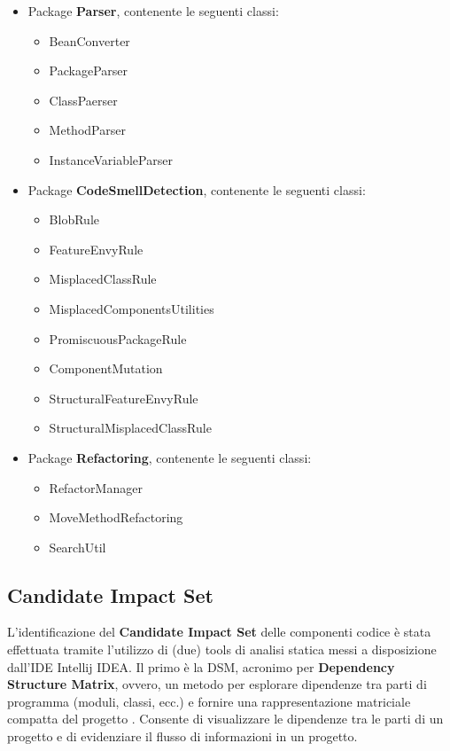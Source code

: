 	\begin{itemize}
		\item Package \textbf{Parser}, contenente le seguenti classi:
			\begin{itemize}
				\item BeanConverter
				\item PackageParser
				\item ClassPaerser
				\item MethodParser
				\item InstanceVariableParser
			\end{itemize}
		
		\item Package \textbf{CodeSmellDetection}, contenente le seguenti classi:
			\begin{itemize}
				
				\item BlobRule
				\item FeatureEnvyRule
				\item MisplacedClassRule
				\item MisplacedComponentsUtilities
				\item PromiscuousPackageRule
				\item ComponentMutation
				\item StructuralFeatureEnvyRule
				\item StructuralMisplacedClassRule
							
			\end{itemize}
		
		\item Package \textbf{Refactoring}, contenente le seguenti classi:
		
			\begin{itemize}
				
				\item RefactorManager
				\item MoveMethodRefactoring
				\item SearchUtil
						
			\end{itemize}	
			
		
		
	\end{itemize}


	\subsection{Candidate Impact Set}

	L'identificazione del \textbf{Candidate Impact Set} delle componenti codice è stata effettuata tramite l'utilizzo di (due) tools di analisi statica messi a disposizione dall'IDE Intellij IDEA. Il primo è la DSM, acronimo per \textbf{Dependency Structure Matrix}, ovvero, un metodo per esplorare dipendenze tra parti di programma (moduli, classi, ecc.) e fornire una rappresentazione matriciale compatta del progetto \cite{dsm}.
	Consente di visualizzare le dipendenze tra le parti di un progetto e di evidenziare il flusso di informazioni in un progetto.
	
